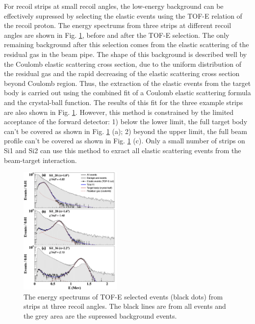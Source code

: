 \documentclass[fleqn,twocolumn,a4paper]{ikpar}
\begin{document}
For recoil strips at small recoil angles, the low-energy background can be effectively supressed by selecting the elastic
events using the TOF-E relation of the recoil proton.
The energy spectrums from three strips at different recoil angles are shown in
Fig. \ref{fig:coulomb_cb2_fit},  before and after the TOF-E selection.
The only remaining background after this selection comes from the elastic scattering of the residual gas in the beam pipe.
The shape of this background is described well by the Coulomb elastic scattering cross
section, due to the uniform distribution of the residual gas \cite{r2} and the rapid decreasing of
the elastic scattering cross section beyond Coulomb region.
Thus, the extraction of the elastic events from the target body is carried out
using the combined fit of a Coulomb elastic scattering formula and the crystal-ball
function.
The results of this fit for the three example strips are also shown in Fig. \ref{fig:coulomb_cb2_fit}.
However, this method is constrained by the limited acceptance of the forward detector:
1) below the lower limit, the full target body can't be covered as shown in Fig.
\ref{fig:coulomb_cb2_fit} (a);
2) beyond the upper limit, the full beam profile can't be covered as shown in
Fig. \ref{fig:coulomb_cb2_fit} (c).
Only a small number of strips on Si1 and Si2 can use this method to exract all
elastic scattering events from the beam-target interaction.
\begin{figure}[!htb]
	\includegraphics[width=0.45\textwidth]{./coulomb_cb2_fit.png}
  \caption{The energy spectrums of TOF-E selected events (black dots) from strips at three
    recoil angles. The black lines are from all events and the grey area are the
  supressed background events. }
  \label{fig:coulomb_cb2_fit}
\end{figure}
\end{document}
